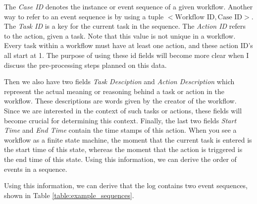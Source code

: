 \documentclass[a4paper,11pt]{article}
\begin{document}
The \textit{Case ID} denotes the instance or event sequence of a given workflow. Another way to refer to an event sequence is by using a tuple $<\text{Workflow ID}, \text{Case ID}>$. The \textit{Task ID} is a key for the current task in the sequence. The \textit{Action ID} refers to the action, given a task. Note that this value is not unique in a workflow. Every task within a workflow must have at least one action, and these action ID's all start at 1. The purpose of using these id fields will become more clear when I discuss the pre-processing steps planned on this data.

Then we also have two fields \textit{Task Desciption} and \textit{Action Description} which represent the actual meaning or reasoning behind a task or action in the workflow. These descriptions are words given by the creator of the workflow. Since we are interested in the context of such tasks or actions, these fields will become crucial for determining this context.
Finally, the last two fields \textit{Start Time} and \textit{End Time} contain the time stamps of this action. When you see a workflow as a finite state machine, the moment that the current task is entered is the start time of this state, whereas the moment that the action is triggered is the end time of this state. Using this information, we can derive the order of events in a sequence.

Using this information, we can derive that the log contains two event sequences, shown in Table \ref{table:example_sequences}. 
\end{document}
